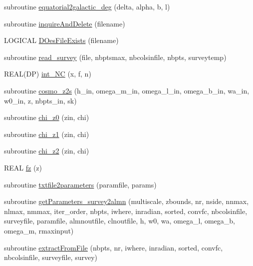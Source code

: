 \begin{DoxyCompactItemize}
\item 
subroutine \hyperlink{namespacef3dex__cosmotools_abeb005e8bef92ebc0927b69db637906d}{equatorial2galactic\_\-deg} (delta, alpha, b, l)
\item 
subroutine \hyperlink{namespacef3dex__cosmotools_a0caf479bc891741c90e36f878444e333}{inquireAndDelete} (filename)
\item 
LOGICAL \hyperlink{namespacef3dex__cosmotools_ae0ff007b365be41cbcf5e7ed24cccac2}{DOesFileExists} (filename)
\item 
subroutine \hyperlink{namespacef3dex__cosmotools_a36578d36cffe32d26a9fd914d032ef3a}{read\_\-survey} (file, nbptsmax, nbcolsinfile, nbpts, surveytemp)
\item 
REAL(DP) \hyperlink{namespacef3dex__cosmotools_a25e2703c39b2d99c864537823f2f8402}{int\_\-NC} (x, f, n)
\item 
subroutine \hyperlink{namespacef3dex__cosmotools_a78ae43d2bd5f180e65c710dc694bcee4}{cosmo\_\-z2s} (h\_\-in, omega\_\-m\_\-in, omega\_\-l\_\-in, omega\_\-b\_\-in, wa\_\-in, w0\_\-in, z, nbpts\_\-in, sk)
\item 
subroutine \hyperlink{namespacef3dex__cosmotools_abdbb37c7c522bf29ebf089412b9d7854}{chi\_\-z0} (zin, chi)
\item 
subroutine \hyperlink{namespacef3dex__cosmotools_aae4fa92003adf2bfde48fa0dfcbf6b51}{chi\_\-z1} (zin, chi)
\item 
subroutine \hyperlink{namespacef3dex__cosmotools_a6c29a874ae95da9fb207a2f63729eecf}{chi\_\-z2} (zin, chi)
\item 
REAL \hyperlink{namespacef3dex__cosmotools_abba0e9b02d0f46a5abce5a0830da7f4d}{fz} (z)
\item 
subroutine \hyperlink{namespacef3dex__cosmotools_a609d3f29da9fc1be3bf27757e25532eb}{txtfile2parameters} (paramfile, params)
\item 
subroutine \hyperlink{namespacef3dex__cosmotools_a8405dbd12e86a408520f40f1b0a68919}{getParameters\_\-survey2almn} (multiscale, zbounds, nr, nside, nnmax, nlmax, nmmax, iter\_\-order, nbpts, iwhere, inradian, sorted, convfc, nbcolsinfile, surveyfile, paramfile, almnoutfile, clnoutfile, h, w0, wa, omega\_\-l, omega\_\-b, omega\_\-m, rmaxinput)
\item 
subroutine \hyperlink{namespacef3dex__cosmotools_aaef3c07f112a83e6ff7a2762d5202fae}{extractFromFile} (nbpts, nr, iwhere, inradian, sorted, convfc, nbcolsinfile, surveyfile, survey)
\end{DoxyCompactItemize}
